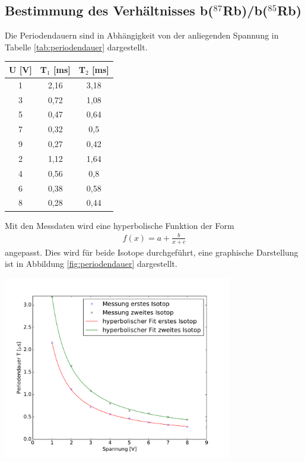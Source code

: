 \documentclass[]{scrartcl}
\begin{document}
\subsection{Bestimmung des Verhältnisses b($^{87}$Rb)/b($^{85}$Rb)}
Die Periodendauern sind in Abhängigkeit von der anliegenden Spannung in Tabelle \ref{tab:periodendauer} dargestellt. 
\begin{center}
	\begin{tabular}{|c|c|c|}
	\hline U [V] & T$_1$ [ms] & T$_2$ [ms] \\
	\hline	1	&	2,16	&	3,18	\\
	\hline	3	&	0,72	&	1,08	\\
	\hline	5	&	0,47	&	0,64	\\
	\hline	7	&	0,32	&	0,5	\\
	\hline	9	&	0,27	&	0,42	\\
	\hline	2	&	1,12	&	1,64	\\
	\hline	4	&	0,56	&	0,8	\\
	\hline	6	&	0,38	&	0,58	\\
	\hline	8	&	0,28	&	0,44	\\
	\hline 
	\end{tabular}
\label{tab:periodendauer}
\end{center}
Mit den Messdaten wird eine hyperbolische Funktion der Form
\begin{align*}
f(x)=a+\frac{b}{x+c}
\end{align*}
angepasst. Dies wird für beide Isotope durchgeführt, eine graphische Darstellung ist in Abbildung \ref{fig:periodendauer} dargestellt.
\begin{center}
	\includegraphics[width=10cm]{images/plot2.pdf}
	\label{fig:periodendauer}
\end{center}
\end{document}
